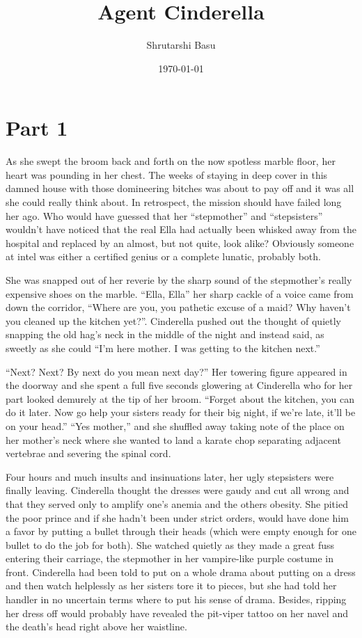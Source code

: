 \documentclass[11pt,letterpaper]{article}
\title{Agent Cinderella}
\author{Shrutarshi Basu}
\date{\today}
\begin{document}
\maketitle
\doublespacing

\section*{Part 1}

As she swept the broom back and forth on the now spotless marble floor, her heart was pounding in her chest. The weeks of staying in deep cover in this damned house with those domineering bitches was about to pay off and it was all she could really think about. In retrospect, the mission should have failed long her ago. Who would have guessed that her ``stepmother'' and ``stepsisters'' wouldn't have noticed that the real Ella had actually been whisked away from the hospital and replaced by an almost, but not quite, look alike? Obviously someone at intel was either a certified genius or a complete lunatic, probably both.

She was snapped out of her reverie by the sharp sound of the stepmother's really expensive shoes on the marble. ``Ella, Ella'' her sharp cackle of a voice came from down the corridor, ``Where are you, you pathetic excuse of a maid? Why haven't you cleaned up the kitchen yet?''. Cinderella pushed out the thought of quietly snapping the old hag's neck in the middle of the night and instead said, as sweetly as she could ``I'm here mother. I was getting to the kitchen next.''

``Next? Next? By next do you mean next day?'' Her towering figure appeared in the doorway and she spent a full five seconds glowering at Cinderella who for her part looked demurely at the tip of her broom. ``Forget about the kitchen, you can do it later. Now go help your sisters ready for their big night, if we're late, it'll be on your head.'' ``Yes mother,'' and she shuffled away taking note of the place on her mother's neck where she wanted to land a karate chop separating adjacent vertebrae and severing the spinal cord.

Four hours and much insults and insinuations later, her ugly stepsisters were finally leaving. Cinderella thought the dresses were gaudy and cut all wrong and that they served only to amplify one's anemia and the others obesity. She pitied the poor prince and if she hadn't been under strict orders, would have done him a favor by putting a bullet through their heads (which were empty enough for one bullet to do the job for both). She watched quietly as they made a great fuss entering their carriage, the stepmother in her vampire-like purple costume in front. Cinderella had been told to put on a whole drama about putting on a dress and then watch helplessly as her sisters tore it to pieces, but she had told her handler in no uncertain terms where to put his sense of drama. Besides, ripping her dress off would probably have revealed the pit-viper tattoo on her navel and the death's head right above her waistline.
\end{document}
